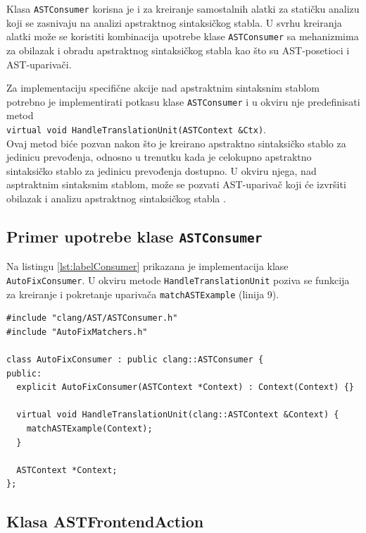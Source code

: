 \documentclass[12pt,oneside]{memoir}
\begin{document}
Klasa \texttt{ASTConsumer} korisna je i za kreiranje samostalnih alatki za stati\v{c}ku analizu koji se zasnivaju na analizi apstraktnog sintaksi\v{c}kog stabla. U svrhu kreiranja alatki mo\v{z}e se koristiti kombinacija upotrebe klase \texttt{ASTConsumer} sa mehanizmima za obilazak i obradu apstraktnog sintaksi\v{c}kog stabla kao \v{s}to su AST-posetioci i AST-upariva\v{c}i. \par
Za implementaciju specifi\v{c}ne akcije nad apstraktnim sintaksnim stablom
potrebno je implementirati potkasu klase \texttt{ASTConsumer} i u okviru nje predefinisati metod \\ \texttt{virtual void  HandleTranslationUnit(ASTContext \&Ctx)}.\\
Ovaj metod bi\'{c}e pozvan nakon \v{s}to je kreirano apstraktno sintaksi\v{c}ko stablo za jedinicu prevođenja, odnosno u trenutku kada je celokupno apstraktno sintaksi\v{c}ko stablo za jedinicu prevođenja dostupno.
U okviru njega, nad asptraktnim sintaksnim stablom, mo\v{z}e se pozvati AST-upariva\v{c} koji \'{c}e izvr\v{s}iti obilazak i analizu apstraktnog sintaksi\v{c}kog stabla \cite{ASTConsumer}.

\subsection{Primer upotrebe klase \texttt{ASTConsumer}}
Na listingu \ref{lst:labelConsumer} prikazana je implementacija klase \texttt{AutoFixConsumer}. U okviru metode \texttt{HandleTranslationUnit}
poziva se funkcija za kreiranje i pokretanje upariva\v{c}a \texttt{matchASTExample} (linija 9). 

\begin{lstlisting}[style=customc,  caption={Implementacija klase \texttt{AutoFixConsumer}. Funkcija \texttt{matchASTExample} prikazana je na listingu \ref{lst:MatcherList} i dostupna je kroz zaglavlje \texttt{AutoFixMatchers.h}.}, label=lst:labelConsumer]
#include "clang/AST/ASTConsumer.h"
#include "AutoFixMatchers.h"

class AutoFixConsumer : public clang::ASTConsumer {
public:
  explicit AutoFixConsumer(ASTContext *Context) : Context(Context) {}

  virtual void HandleTranslationUnit(clang::ASTContext &Context) {
    matchASTExample(Context);
  }

  ASTContext *Context;
};
\end{lstlisting}

\subsection{Klasa ASTFrontendAction}
\end{document}
